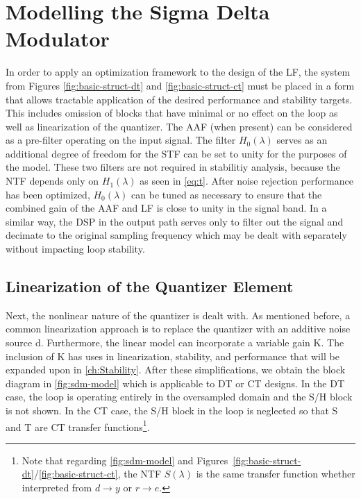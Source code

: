 
\chapter{Modelling the Sigma Delta Modulator}
\label{ch:Modelling}

In order to apply an optimization framework to the design of the \gls{LF}, the system from Figures \ref{fig:basic-struct-dt} and \ref{fig:basic-struct-ct} must be placed in a form that allows tractable application of the desired performance and stability targets. This includes omission of blocks that have minimal or no effect on the loop as well as linearization of the quantizer. The \gls{AAF} (when present) can be considered as a pre-filter operating on the input signal. The filter $H_0(\lambda)$ serves as an additional degree of freedom for the \gls{STF} can be set to unity for the purposes of the model. These two filters are not required in stabilitiy analysis, because the \gls{NTF} depends only on $H_1(\lambda)$ as seen in \autoref{eq:t}. After noise rejection performance has been optimized, $H_0(\lambda)$ can be tuned as necessary to ensure that the combined gain of the \gls{AAF} and \gls{LF} is close to unity in the signal band. In a similar way, the \gls{DSP} in the output path serves only to filter out the signal and decimate to the original sampling frequency which may be dealt with separately without impacting loop stability.

\section{Linearization of the Quantizer Element}

Next, the nonlinear nature of the quantizer is dealt with. As mentioned before, a common linearization approach is to replace the quantizer with an additive noise source \gls{d}. Furthermore, the linear model can incorporate a variable gain \gls{K}. The inclusion of \gls{K} has uses in linearization, stability, and performance that will be expanded upon in \autoref{ch:Stability}. After these simplifications, we obtain the block diagram in \autoref{fig:sdm-model} which is applicable to \gls{DT} or \gls{CT} designs. In the \gls{DT} case, the loop is operating entirely in the oversampled domain and the \gls{S/H} block is not shown. In the \gls{CT} case, the \gls{S/H} block in the loop is neglected so that \gls{S} and \gls{T} are \gls{CT} transfer functions\footnote{Note that regarding \autoref{fig:sdm-model} and Figures~\ref{fig:basic-struct-dt}/\ref{fig:basic-struct-ct}, the \gls{NTF} $S(\lambda)$ is the same transfer function whether interpreted from $d \rightarrow y$ or $r \rightarrow e$.}.

